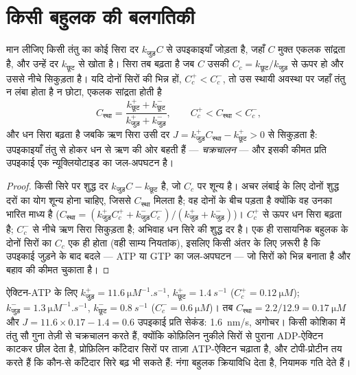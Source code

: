 \section{किसी बहुलक की बलगतिकी}

\begin{theorem}[क्रांतिक सांद्रता और चक्रचालन]\label{thm:b3:cytoskeleton-motility:treadmilling}
मान लीजिए किसी तंतु का कोई सिरा दर $k_{\text{जुड़}}C$ से उपइकाइयाँ जोड़ता
है, जहाँ $C$ मुक्त एकलक सांद्रता है, और उन्हें दर
$k_{\text{छूट}}$ से खोता है। सिरा तब बढ़ता है जब $C$ उसकी \emph{} $C_{c} = k_{\text{छूट}}/k_{\text{जुड़}}$ से ऊपर हो और उससे नीचे
सिकुड़ता है। यदि दोनों सिरों की  भिन्न हों, $C_{c}^{+}
< C_{c}^{-}$, तो उस स्थायी अवस्था पर जहाँ तंतु न लंबा होता है न छोटा,
एकलक सांद्रता होती है
\[
C_{\text{स्था}} = \frac{k_{\text{छूट}}^{+} + k_{\text{छूट}}^{-}}
{k_{\text{जुड़}}^{+} + k_{\text{जुड़}}^{-}},
\qquad C_{c}^{+} < C_{\text{स्था}} < C_{c}^{-},
\]
और धन सिरा बढ़ता है जबकि ऋण सिरा उसी दर
$J = k_{\text{जुड़}}^{+}C_{\text{स्था}} - k_{\text{छूट}}^{+} > 0$ से
सिकुड़ता है: उपइकाइयाँ तंतु से होकर धन से ऋण की ओर बहती हैं ---
\emph{चक्रचालन} --- और इसकी कीमत प्रति उपइकाई एक न्यूक्लियोटाइड का
जल-अपघटन है।
\end{theorem}
\begin{proof}
किसी सिरे पर शुद्ध दर $k_{\text{जुड़}}C - k_{\text{छूट}}$ है, जो
$C_{c}$ पर शून्य है। अचर लंबाई के लिए दोनों शुद्ध दरों का योग शून्य
होना चाहिए, जिससे $C_{\text{स्था}}$ मिलता है; वह दोनों  के बीच पड़ता है क्योंकि वह उनका भारित माध्य है ($C_{\text{स्था}} =
(k_{\text{जुड़}}^{+}C_{c}^{+} + k_{\text{जुड़}}^{-}C_{c}^{-})/(k_{\text{जुड़}}^{+}
+ k_{\text{जुड़}}^{-})$)। $C_{c}^{+}$ से ऊपर धन सिरा बढ़ता है;
$C_{c}^{-}$ से नीचे ऋण सिरा सिकुड़ता है; अभिवाह धन सिरे की शुद्ध दर है।
एक ही रासायनिक बहुलक के दोनों सिरों का $C_{c}$ एक ही होता (वही
साम्य नियतांक), इसलिए किसी अंतर के लिए ज़रूरी है कि उपइकाई जुड़ने के बाद
बदले --- ATP या GTP का जल-अपघटन --- जो सिरों को भिन्न बनाता है और बहाव
की कीमत चुकाता है।
\end{proof}

\begin{example}[परखनली में ऐक्टिन]\label{ex:b3:cytoskeleton-motility:actin-numbers}
ऐक्टिन-ATP के लिए $k_{\text{जुड़}}^{+} = \qty{11.6}{\micro M^{-1}.s^{-1}}$,
$k_{\text{छूट}}^{+} = \qty{1.4}{s^{-1}}$ ($C_{c}^{+} = \qty{0.12}{\micro
M}$); $k_{\text{जुड़}}^{-} = \qty{1.3}{\micro M^{-1}.s^{-1}}$,
$k_{\text{छूट}}^{-} = \qty{0.8}{s^{-1}}$ ($C_{c}^{-} = \qty{0.6}{\micro
M}$)। तब $C_{\text{स्था}} = 2.2/12.9 = \qty{0.17}{\micro M}$ और $J =
11.6\times 0.17 - 1.4 = 0.6$ उपइकाई प्रति सेकंड: \qty{1.6}{nm/s},
अगोचर। किसी कोशिका में तंतु सौ गुना तेज़ी से चक्रचालन करते हैं, क्योंकि
कोफ़िलिन नुकीले सिरों से पुराना ADP-ऐक्टिन काटकर छील देता है, प्रोफ़िलिन
काँटेदार सिरों पर ताज़ा ATP-ऐक्टिन चढ़ाता है, और टोपी-प्रोटीन तय करते
हैं कि कौन-से काँटेदार सिरे बढ़ भी सकते हैं: नंगा बहुलक क्रियाविधि देता
है, नियामक गति देते हैं।
\end{example}

